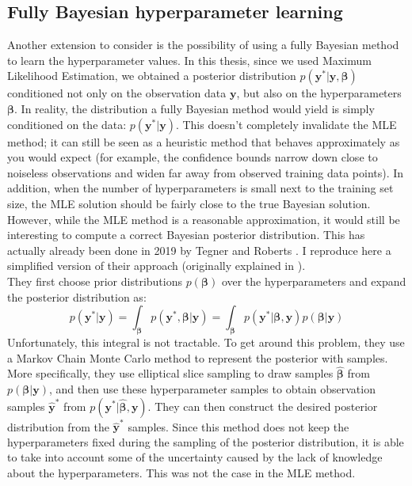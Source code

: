 \documentclass[a4paper,12pt]{article}
\begin{document}
\subsection{Fully Bayesian hyperparameter learning}
Another extension to consider is the possibility of using a fully Bayesian method to learn the hyperparameter values. In this thesis, since we used Maximum Likelihood Estimation, we obtained a posterior distribution $p(\mathbf{y}^*|\mathbf{y}, \boldsymbol{\beta})$ conditioned not only on the observation data $\mathbf{y}$, but also on the hyperparameters $\boldsymbol{\beta}$. In reality, the distribution a fully Bayesian method would yield is simply conditioned on the data: $p(\mathbf{y}^*|\mathbf{y})$. This doesn't completely invalidate the MLE method; it can still be seen as a heuristic method that behaves approximately as you would expect (for example, the confidence bounds narrow down close to noiseless observations and widen far away from observed training data points). In addition, when the number of hyperparameters is small next to the training set size, the MLE solution should be fairly close to the true Bayesian solution.\\
However, while the MLE method is a reasonable approximation, it would still be interesting to compute a correct Bayesian posterior distribution. This has actually already been done in 2019 by Tegner and Roberts \cite{tegner2019}. I reproduce here a simplified version of their approach (originally explained in \cite{GPpredictioninterval}).\\
They first choose prior distributions $p(\boldsymbol{\beta})$ over the hyperparameters and expand the posterior distribution as:
\begin{equation}
    p(\mathbf{y}^*|\mathbf{y}) = \int_{\boldsymbol{\beta}} p(\mathbf{y}^*, \boldsymbol{\beta}|\mathbf{y}) = \int_{\boldsymbol{\beta}} p(\mathbf{y}^*| \boldsymbol{\beta}, \mathbf{y}) p(\boldsymbol{\beta}| \mathbf{y})
\end{equation}
Unfortunately, this integral is not tractable. To get around this problem, they use a Markov Chain Monte Carlo method to represent the posterior with samples. More specifically, they use elliptical slice sampling to draw samples $\hat{\boldsymbol{\beta}}$ from $p(\boldsymbol{\beta}| \mathbf{y})$, and then use these hyperparameter samples to obtain observation samples $\hat{\mathbf{y}}^*$ from $p(\mathbf{y}^*| \hat{\boldsymbol{\beta}}, \mathbf{y})$. They can then construct the desired posterior distribution from the $\hat{\mathbf{y}}^*$ samples. Since this method does not keep the hyperparameters fixed during the sampling of the posterior distribution, it is able to take into account some of the uncertainty caused by the lack of knowledge about the hyperparameters. This was not the case in the MLE method.
\end{document}
